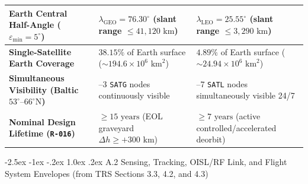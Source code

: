 \documentclass[11pt,a4paper]{article}
\makeatletter
\renewcommand\subsection{\@startsection{subsection}{2}{\z@}%
    {-2.5ex \@plus -1ex \@minus -.2ex}%
    {1.0ex \@plus .2ex}%
    {\normalfont\large\bfseries\sffamily\color{SubHeadingBlue}}}
\providecommand{\abbr}[1]{#1}
\makeatother
\begin{document}
\begin{table}[H]
{\begin{tabularx}{\textwidth}{|>{\raggedright\arraybackslash}p{3.6cm}|>{\raggedright\arraybackslash}X|>{\raggedright\arraybackslash}X|}
    \textbf{Earth Central Half-Angle ($\varepsilon_{\min}=5^\circ$)} & $\lambda_{\text{GEO}} = 76.30^\circ$ (slant range $\le 41{,}120\text{ km}$) & $\lambda_{\text{LEO}} = 25.55^\circ$ (slant range $\le 3{,}290\text{ km}$) \\ \hline
    \textbf{Single-Satellite Earth Coverage} & $38.15\%$ of Earth surface ($\sim 194.6 \times 10^6\text{ km}^2$) & $4.89\%$ of Earth surface ($\sim 24.94 \times 10^6\text{ km}^2$) \\ \hline
    \textbf{Simultaneous Visibility (Baltic $53^\circ\text{--}66^\circ\text{N}$)} & 2--3 \texttt{SATG} nodes continuously visible & 5--7 \texttt{SATL} nodes simultaneously visible 24/7 \\ \hline
    \textbf{Nominal Design Lifetime (\texttt{R-016})} & $\ge 15\text{ years}$ (\abbr{EOL} graveyard $\Delta h \ge +300\text{ km}$) & $\ge 7\text{ years}$ (active controlled/accelerated deorbit) \\ \hline
\end{tabularx}}
\end{table}

\subsection{A.2 Sensing, Tracking, OISL/RF Link, and Flight System Envelopes (from TRS Sections 3.3, 4.2, and 4.3)}
\end{document}
